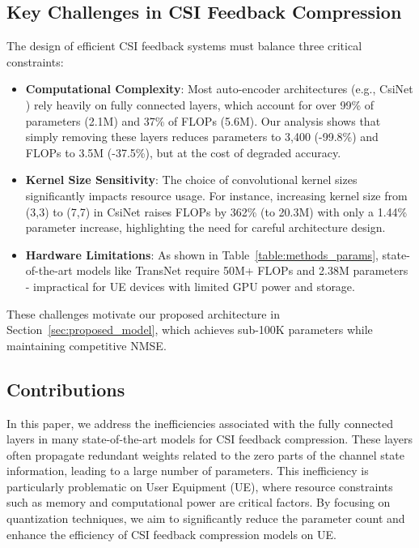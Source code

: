 \documentclass[lettersize,journal]{IEEEtran}
\begin{document}
\subsection{Key Challenges in CSI Feedback Compression}
The design of efficient CSI feedback systems must balance three critical constraints: 
\begin{itemize}
    \item \textbf{Computational Complexity}: Most auto-encoder architectures (e.g., CsiNet \cite{abe}) rely heavily on fully connected layers, which account for over 99\% of parameters (2.1M) and 37\% of FLOPs (5.6M). Our analysis shows that simply removing these layers reduces parameters to 3,400 (-99.8\%) and FLOPs to 3.5M (-37.5\%), but at the cost of degraded accuracy.
    
    \item \textbf{Kernel Size Sensitivity}: The choice of convolutional kernel sizes significantly impacts resource usage. For instance, increasing kernel size from (3,3) to (7,7) in CsiNet \cite{abe} raises FLOPs by 362\% (to 20.3M) with only a 1.44\% parameter increase, highlighting the need for careful architecture design.
    
    \item \textbf{Hardware Limitations}: As shown in Table~\ref{table:methods_params}, state-of-the-art models like TransNet \cite{abz} require 50M+ FLOPs and 2.38M parameters - impractical for UE devices with limited GPU power and storage.
\end{itemize}
These challenges motivate our proposed architecture in Section~\ref{sec:proposed_model}, which achieves sub-100K parameters while maintaining competitive NMSE.



\subsection{Contributions}

In this paper, we address the inefficiencies associated with the fully connected layers in many state-of-the-art models for CSI feedback compression. These layers often propagate redundant weights related to the zero parts of the channel state information, leading to a large number of parameters. This inefficiency is particularly problematic on User Equipment (UE), where resource constraints such as memory and computational power are critical factors. By focusing on quantization techniques, we aim to significantly reduce the parameter count and enhance the efficiency of CSI feedback compression models on UE.
\end{document}
